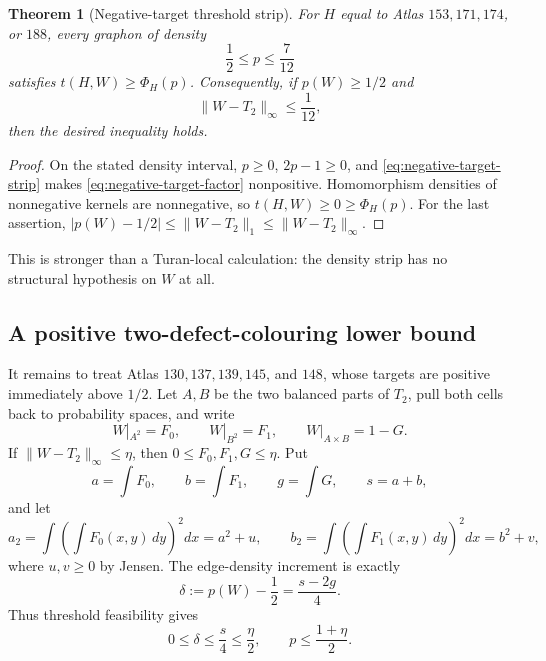 \documentclass[11pt]{article}
\newtheorem{theorem}{Theorem}[section]
\begin{document}
\begin{theorem}[Negative-target threshold strip]
\label{thm:negative-target-strip}
For $H$ equal to Atlas $153,171,174$, or $188$, every graphon of density
\[
 \frac12\leq p\leq\frac7{12}
\]
satisfies $t(H,W)\geq\Phi_H(p)$.  Consequently, if
$p(W)\geq1/2$ and
\[
 \lVert W-T_2\rVert_\infty\leq\frac1{12},
\]
then the desired inequality holds.
\end{theorem}

\begin{proof}
On the stated density interval, $p\geq0$, $2p-1\geq0$, and
\eqref{eq:negative-target-strip} makes
\eqref{eq:negative-target-factor} nonpositive.  Homomorphism densities of
nonnegative kernels are nonnegative, so
$t(H,W)\geq0\geq\Phi_H(p)$.  For the last assertion,
$|p(W)-1/2|\leq\lVert W-T_2\rVert_1
\leq\lVert W-T_2\rVert_\infty$.
\end{proof}

This is stronger than a Turan-local calculation: the density strip has no
structural hypothesis on $W$ at all.

\subsection{A positive two-defect-colouring lower bound}

It remains to treat Atlas $130,137,139,145$, and $148$, whose targets are
positive immediately above $1/2$.  Let $A,B$ be the two balanced parts of
$T_2$, pull both cells back to probability spaces, and write
\[
 W|_{A^2}=F_0,\qquad W|_{B^2}=F_1,\qquad
 W|_{A\times B}=1-G.
\]
If $\lVert W-T_2\rVert_\infty\leq\eta$, then
$0\leq F_0,F_1,G\leq\eta$.  Put
\[
 a=\int F_0,\qquad b=\int F_1,\qquad g=\int G,
 \qquad s=a+b,
\]
and let
\[
 a_2=\int\left(\int F_0(x,y)\,dy\right)^2dx=a^2+u,
 \qquad
 b_2=\int\left(\int F_1(x,y)\,dy\right)^2dx=b^2+v,
\]
where $u,v\geq0$ by Jensen.  The edge-density increment is exactly
\begin{equation}
 \delta:=p(W)-\frac12=\frac{s-2g}{4}.
 \label{eq:two-defect-density}
\end{equation}
Thus threshold feasibility gives
\begin{equation}
 0\leq\delta\leq\frac{s}{4}\leq\frac\eta2,
 \qquad p\leq\frac{1+\eta}{2}.
 \label{eq:two-defect-scalar-bounds}
\end{equation}
\end{document}
